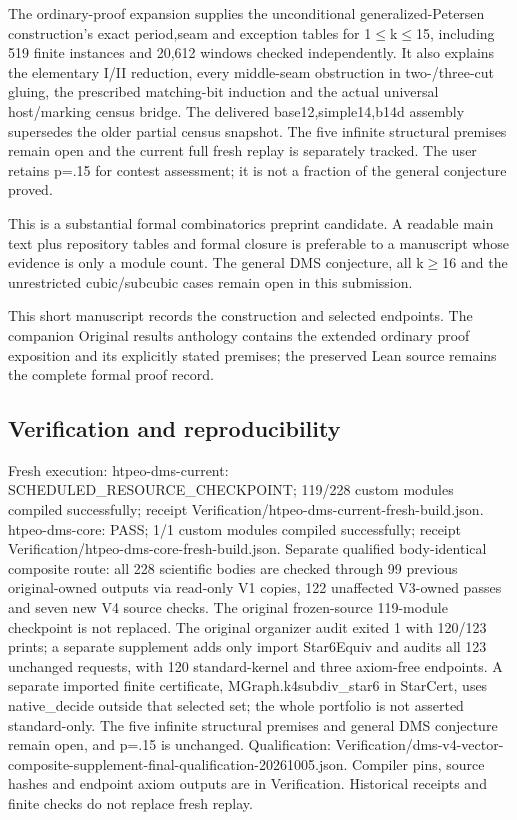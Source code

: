 \documentclass[11pt,a4paper]{article}
\begin{document}
The ordinary-proof expansion supplies the unconditional generalized-Petersen construction's exact period,seam and exception tables for 1\ensuremath{\leq}k\ensuremath{\leq}15, including 519 finite instances and 20,612 windows checked independently. It also explains the elementary I/II reduction, every middle-seam obstruction in two-/three-cut gluing, the prescribed matching-bit induction and the actual universal host/marking census bridge. The delivered base12,simple14,b14d assembly supersedes the older partial census snapshot. The five infinite structural premises remain open and the current full fresh replay is separately tracked. The user retains p=.15 for contest assessment; it is not a fraction of the general conjecture proved.

This is a substantial formal combinatorics preprint candidate. A readable main text plus repository tables and formal closure is preferable to a manuscript whose evidence is only a module count. The general DMS conjecture, all k\ensuremath{\geq}16 and the unrestricted cubic/subcubic cases remain open in this submission.

{\small This short manuscript records the construction and selected endpoints. The companion Original results anthology contains the extended ordinary proof exposition and its explicitly stated premises; the preserved Lean source remains the complete formal proof record.\par}

\subsection{Verification and reproducibility}
Fresh execution: htpeo-dms-current: SCHEDULED\_RESOURCE\_CHECKPOINT; 119/228 custom modules compiled successfully; receipt Verification/htpeo-dms-current-fresh-build.json. htpeo-dms-core: PASS; 1/1 custom modules compiled successfully; receipt Verification/htpeo-dms-core-fresh-build.json. Separate qualified body-identical composite route: all 228 scientific bodies are checked through 99 previous original-owned outputs via read-only V1 copies, 122 unaffected V3-owned passes and seven new V4 source checks. The original frozen-source 119-module checkpoint is not replaced. The original organizer audit exited 1 with 120/123 prints; a separate supplement adds only import Star6Equiv and audits all 123 unchanged requests, with 120 standard-kernel and three axiom-free endpoints. A separate imported finite certificate, MGraph.k4subdiv\_star6 in StarCert, uses native\_decide outside that selected set; the whole portfolio is not asserted standard-only. The five infinite structural premises and general DMS conjecture remain open, and p=.15 is unchanged. Qualification: Verification/dms-v4-vector-composite-supplement-final-qualification-20261005.json. Compiler pins, source hashes and endpoint axiom outputs are in Verification. Historical receipts and finite checks do not replace fresh replay.
\end{document}
